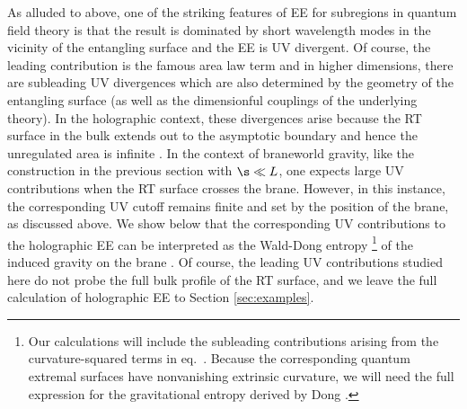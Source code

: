 As alluded to above, one of the striking features of EE for subregions in quantum field theory is that the result is dominated by short wavelength modes in the vicinity of the entangling surface and the EE is UV divergent. Of course, the leading contribution is the famous area law term \cite{Sorkin_1983,Bombelli:1986rw,Srednicki:1993im} and in higher dimensions, there are subleading UV divergences which are also determined by the geometry of the entangling surface (as well as the dimensionful couplings of the underlying theory). In the holographic context, these divergences arise because the RT surface in the bulk extends out to the asymptotic boundary and hence the unregulated area is infinite \cite{Ryu:2006bv,Ryu:2006ef,Rangamani:2016dms}. In the context of braneworld gravity, like the construction in the previous section with $\s\ll L$, one expects large UV contributions when the RT surface crosses the brane. However, in this instance, the corresponding UV cutoff remains finite and set by the position of the brane, as discussed above. We show below that the corresponding UV contributions to the holographic EE can be interpreted as the Wald-Dong entropy \cite{Wald:1993nt,Iyer:1994ys,Jacobson:1993vj,Dong:2013qoa}\footnote{Our calculations will include the subleading contributions arising from the curvature-squared terms in eq.~. Because the corresponding quantum extremal surfaces have nonvanishing extrinsic curvature, we will need the full expression for the gravitational entropy derived by Dong \cite{Dong:2013qoa}.} of the induced gravity on the brane \cite{Emparan:2006ni,Myers:2013lva}. Of course, the leading UV contributions studied here do not probe the full bulk profile of the RT surface, and we leave the full calculation of holographic EE to Section \ref{sec:examples}.

\begin{figure}[h]
	\def\svgwidth{0.5\linewidth}
\end{figure}
%  


